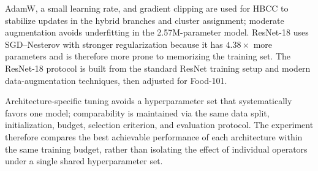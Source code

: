 \documentclass[conference]{IEEEtran}
\begin{document}
\begin{table}[ht!]
  \caption{Per-architecture training hyperparameters on Food-101.}
  \label{tab:food_recipe}
  \centering
  \renewcommand{\arraystretch}{1.10}
\end{table}

AdamW, a small learning rate, and gradient clipping are used for HBCC
to stabilize updates in the hybrid branches and cluster assignment;
moderate augmentation avoids underfitting in the 2.57M-parameter
model. ResNet-18 uses SGD--Nesterov with stronger regularization
because it has $4.38\times$ more parameters and is therefore more
prone to memorizing the training set. The ResNet-18 protocol is built
from the standard ResNet training setup and modern data-augmentation
techniques, then adjusted for Food-101.

Architecture-specific tuning avoids a hyperparameter set that
systematically favors one model; comparability is maintained via the
same data split, initialization, budget, selection criterion, and
evaluation protocol. The experiment therefore compares the best
achievable performance of each architecture within the same training
budget, rather than isolating the effect of individual operators under
a single shared hyperparameter set.
\end{document}

